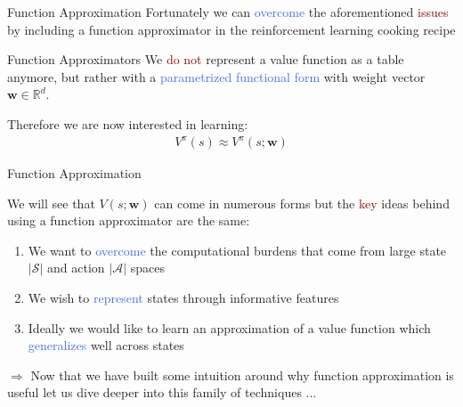 \documentclass{beamer}
\begin{document}
\begin{frame}{Function Approximation}
	Fortunately we can \textcolor{RoyalBlue}{overcome} the aforementioned \textcolor{Maroon}{issues} by including a function approximator in the reinforcement learning cooking recipe
	\begin{block}{Function Approximators}
		We \textcolor{Maroon}{do not} represent a value function as a table anymore, but rather with a \textcolor{RoyalBlue}{parametrized functional form} with weight vector $\mathbf{w}\in\mathds{R}^{d}$.


		Therefore we are now interested in learning:
		\begin{align*}
			V^{\pi}(s) \approx V^{\pi}(s;\mathbf{w})
		\end{align*}
	\end{block}

\end{frame}

\begin{frame}{Function Approximation}

	We will see that $V(s;\mathbf{w})$ can come in numerous forms but the \textcolor{Maroon}{key} ideas behind using a function approximator are the same:
	\begin{enumerate}
		\item We want to \textcolor{RoyalBlue}{overcome} the computational burdens that come from large state $|\mathcal{S}|$ and action $|\mathcal{A}|$ spaces
		\item We wish to \textcolor{RoyalBlue}{represent} states through informative features
		\item Ideally we would like to learn an approximation of a value function which \textcolor{RoyalBlue}{generalizes} well across states
	\end{enumerate}

	\bigskip


	$\Rightarrow$ Now that we have built some intuition around why function approximation is useful let us dive deeper into this family of techniques ...


\end{frame}
\end{document}
